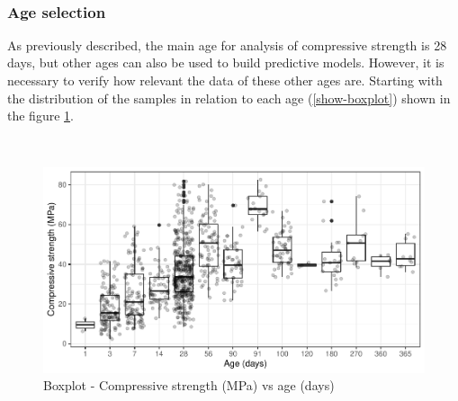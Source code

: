 \documentclass[
]{article}
\begin{document}
~

\begin{table}[H]

\caption{\label{tab:similar-samples-same-id}Previous samples after processing}
\centering
{}
\end{table}

\hypertarget{age-selection}{%
\subsubsection{Age selection}\label{age-selection}}

As previously described, the main age for analysis of compressive
strength is 28 days, but other ages can also be used to build predictive
models. However, it is necessary to verify how relevant the data of
these other ages are. Starting with the distribution of the samples in
relation to each age (\ref{show-boxplot}) shown in the figure
\ref{fig:boxplot}.

~

\begin{figure}

{\centering \includegraphics{paper_EN_files/figure-latex/boxplot-1} 

}

\caption{Boxplot - Compressive strength (MPa) vs age (days)}\label{fig:boxplot}
\end{figure}
\end{document}
